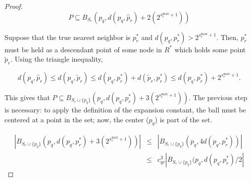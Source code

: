 \begin{proof}
\vspace*{-0.8em}
\begin{equation}
P \subseteq B_{S_r}(p_q, d(p_q, \hat{p}_r) + 2(2^{s_r^{\max} + 1}))
\end{equation}
\vspace*{-0.8em}



Suppose that the true nearest neighbor is $p_r^*$ and $d(p_q, p_r^*) >
2^{s_r^{\max} + 1}$.  Then, $p_r^*$ must be held as a descendant point of some
node in $R^*$ which holds some point $\tilde{p}_r$.  Using the triangle
inequality,

\vspace*{-1.0em}
\begin{equation}
d(p_q, \hat{p}_r) \le d(p_q, \tilde{p}_r)
 \le d(p_q, p_r^*) + d(\tilde{p}_r, p_r^*)
 \le d(p_q, p_r^*) + 2^{s_r^{\max} + 1}.
\end{equation}
\vspace*{-0.8em}

This gives that
$P \subseteq B_{S_r \cup \{ p_q \}}(p_q, d(p_q, p_r^*) + 3(2^{s_r^{\max} +
1}))$.
The previous step is necessary: to apply the definition of the expansion
constant, the ball must be centered at a point in the set; now, the center
($p_q$) is part of the set.

\vspace*{-1.2em}
\begin{eqnarray}
| B_{S_r \cup \{ p_q \}}(p_q, d(p_q, p_r^*) + 3(2^{s_r^{\max} + 1})) | &\le& |
B_{S_r \cup \{ p_q \}}(p_q, 4 d(p_q, p_r^*)) | \\
 &\le& c_{qr}^3 | B_{S_r \cup \{ p_q \}}(p_q, d(p_q, p_r^*) / 2 |
\end{eqnarray}
\vspace*{-0.8em}


\end{proof}
